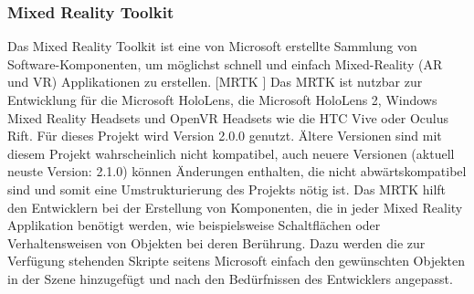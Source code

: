\documentclass[11pt, titlepage, fleqn]{report}
\begin{document}
                \subsubsection{Mixed Reality Toolkit}
                    Das Mixed Reality Toolkit ist eine von Microsoft erstellte Sammlung von Software-Komponenten, um möglichst schnell und einfach 
                    Mixed-Reality (AR und VR) Applikationen zu erstellen. [MRTK 
                    \cite{MRTK}]\newline
                    Das MRTK ist nutzbar zur Entwicklung für die Microsoft 
                    HoloLens, die Microsoft HoloLens 2, Windows Mixed Reality 
                    Headsets und OpenVR 
                    Headsets wie die HTC Vive oder Oculus Rift.
                    Für dieses Projekt wird Version 2.0.0 genutzt. Ältere 
                    Versionen sind mit diesem Projekt wahrscheinlich nicht 
                    kompatibel, 
                    auch neuere Versionen (aktuell neuste Version: 2.1.0) können Änderungen enthalten, die nicht abwärtskompatibel sind und 
                    somit eine Umstrukturierung des Projekts nötig ist.\newline
                    Das MRTK hilft den Entwicklern bei der Erstellung von Komponenten, die in jeder Mixed Reality Applikation benötigt werden, 
                    wie beispielsweise Schaltflächen oder Verhaltensweisen von 
                    Objekten bei deren Berührung. Dazu werden die zur Verfügung 
                    stehenden Skripte
                     seitens Microsoft einfach den gewünschten Objekten in der Szene hinzugefügt und nach den Bedürfnissen des Entwicklers angepasst.
                
\end{document}
